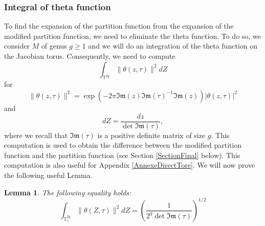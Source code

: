 \documentclass{article}
\newtheorem{Lemma}[theorem]{Lemma}
\theoremstyle{definition}
\theoremstyle{remark}
\begin{document}
\subsubsection{Integral of theta function}\label{AnnexeCalculTheta}
To find the expansion of the partition function from the expansion of the modified partition function, we need to eliminate the theta function. To do so, we consider $M$ of genus $g\geq1$ and we will do an integration of the theta function on the Jacobian torus. Consequently, we need to compute  
$$\int_{\mathbb{T}^{2g}} \|\theta(z,\tau)\|^{2} dZ$$ for $$\|\theta(z,\tau)\|^{2}=\exp\left(-2\pi \mathfrak{Im}(z)\mathfrak{Im}(\tau)^{-1}\mathfrak{Im}(z) \right)|\theta(z,\tau)|^{2}$$ and $$dZ=\frac{dz}{\det\mathfrak{Im}(\tau)},$$ where we recall that $\mathfrak{Im}(\tau)$ is a positive definite matrix of size $g.$ 
This computation is used to obtain the difference between the modified partition function and the partition function (see Section \ref{SectionFinal} below). This computation is also useful for Appendix \ref{AnnexeDirectTore}.
We will now prove the following useful Lemma.
\begin{Lemma}
    The following equality holds: $$\int_{\mathbb{T}^{2g}_{\tau}} \|\theta(Z,\tau)\|^{2} dZ=\left(\frac{1}{2^{g}\det\mathfrak{Im}(\tau)}\right)^{1/2}$$
\end{Lemma} 
\end{document}
